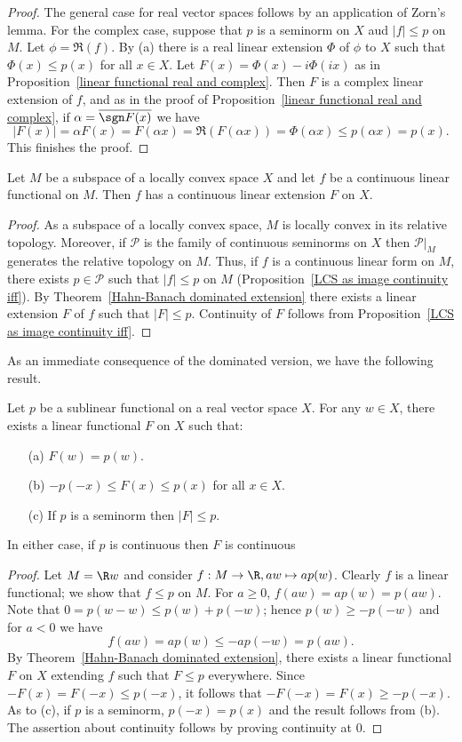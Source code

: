 \begin{proof}
The general case for real vector spaces follows by an application of Zorn's lemma. For the complex case, suppose that $p$ is a seminorm on $X$ aud $|f|\leq p$ on $M$. Let $\phi=\Re(f)$. By (a) there is a real linear extension $\Phi$ of $\phi$ to $X$ such that $\Phi(x)\leq p(x)$ for all $x\in X$. Let $F(x)=\Phi(x)-i\Phi(ix)$ as in Proposition~\ref{linear functional real and complex}. Then $F$ is a complex linear extension of $f$, and as in the proof of Proposition~\ref{linear functional real and complex}, if $\alpha=\overline{\sgn F(x)}$ we have 
\[|F(x)|=\alpha F(x)=F(\alpha x)=\Re(F(\alpha x))=\Phi(\alpha x)\leq p(\alpha x)=p(x).\]
This finishes the proof. 
\end{proof}
\begin{corollary}\label{LCS continuous functional extension}
Let $M$ be a subspace of a locally convex space $X$ and let $f$ be a continuous linear functional on $M$. Then $f$ has a continuous linear extension $F$ on $X$.
\end{corollary}
\begin{proof}
As a subspace of a locally convex space, $M$ is locally convex in its relative topology. Moreover, if $\mathscr{P}$ is the family of continuous seminorms on $X$ then $\mathscr{P}|_M$ generates the relative topology on $M$. Thus, if $f$ is a continuous linear form on $M$, there exists $p\in\mathscr{P}$ such that $|f|\leq p$ on $M$ (Proposition~\ref{LCS as image continuity iff}). By Theorem~\ref{Hahn-Banach dominated extension} there exists a linear extension $F$ of $f$ such that $|F|\leq p$. Continuity of $F$ follows from Proposition~\ref{LCS as image continuity iff}.
\end{proof}
As an immediate consequence of the dominated version, we have the following result.
\begin{proposition}\label{TVS sublinear induced linear functional}
Let $p$ be a sublinear functional on a real vector space $X$. For any $w\in X$, there exists a linear functional $F$ on $X$ such that:
\begin{itemize}
\item[(a)] $F(w)=p(w)$.
\item[(b)] $-p(-x)\leq F(x)\leq p(x)$ for all $x\in X$.
\item[(c)] If $p$ is a seminorm then $|F|\leq p$.
\end{itemize}
In either case, if $p$ is continuous then $F$ is continuous
\end{proposition}
\begin{proof}
Let $M=\R w$ and consider $f:M\to\R,aw\mapsto ap(w)$. Clearly $f$ is a linear functional; we show that $f\leq p$ on $M$. For $a\geq 0$, $f(aw)=ap(w)=p(aw)$. Note that $0=p(w-w)\leq p(w)+p(-w)$; hence $p(w)\geq -p(-w)$ and for $a<0$ we have
\[f(aw)=ap(w)\leq -ap(-w)=p(aw).\]
By Theorem~\ref{Hahn-Banach dominated extension}, there exists a linear functional $F$ on $X$ extending $f$ such that $F\leq p$ everywhere. Since $-F(x)=F(-x)\leq p(-x)$, it follows that $-F(-x)=F(x)\geq -p(-x)$. As to (c), if $p$ is a seminorm, $p(-x)=p(x)$ and the result follows from (b). The assertion about continuity follows by
proving continuity at $0$.
\end{proof}
